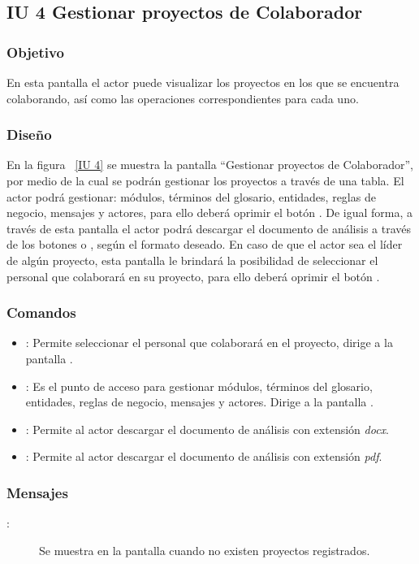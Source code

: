 \newpage 
\subsection{IU 4 Gestionar proyectos de Colaborador}
\subsubsection{Objetivo}
	
	En esta pantalla el actor puede visualizar los proyectos en los que se encuentra colaborando, así como las operaciones correspondientes para cada uno.

\subsubsection{Diseño}

    En la figura ~\ref{IU 4} se muestra la pantalla ``Gestionar proyectos de Colaborador'', por medio de la cual 
    se podrán gestionar los proyectos a través de una tabla. El actor podrá gestionar: módulos, términos del glosario, entidades, reglas de negocio, mensajes y actores, para ello deberá oprimir el botón \btnEntrar. De igual forma, a través de esta pantalla el actor podrá descargar el documento de análisis a través de los botones \btnWord o \btnPDF, según el formato deseado. En caso de que el actor sea el líder de algún proyecto, esta pantalla le brindará la posibilidad de seleccionar el personal que colaborará en su proyecto, para ello deberá oprimir el botón \btnColaboradores.
    


\subsubsection{Comandos}
\begin{itemize}
	\item {}: Permite seleccionar el personal que colaborará en el proyecto, dirige a la pantalla .
	\item \btnEntrar[Entrar]: Es el punto de acceso para gestionar módulos, términos del glosario, entidades, reglas de negocio, mensajes y actores. Dirige a la pantalla .
	\item {}: Permite al actor descargar el documento de análisis con extensión {\it docx}.
	\item {}: Permite al actor descargar el documento de análisis con extensión {\it pdf}.
	\end{itemize}
\subsubsection{Mensajes}
	
\begin{description}
	\item[:] Se muestra en la pantalla  cuando no existen proyectos registrados.
\end{description}
